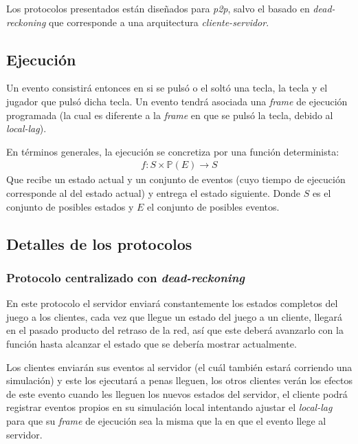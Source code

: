 Los protocolos presentados están diseñados para \emph{p2p}, salvo el basado en \emph{dead-reckoning} que corresponde a una arquitectura \emph{cliente-servidor}.

\subsection{Ejecución}

Un evento consistirá entonces en si se pulsó o el soltó una tecla, la tecla y el jugador que pulsó dicha tecla. Un evento tendrá asociada una \emph{frame} de ejecución programada (la cual es diferente a la \emph{frame} en que se pulsó la tecla, debido al \emph{local-lag}).

En términos generales, la ejecución se concretiza por una función determinista:
\begin{align*}
    f : S \times \mathbb{P}(E) \rightarrow S
\end{align*}
Que recibe un estado actual y un conjunto de eventos (cuyo tiempo de ejecución corresponde al del estado actual) y entrega el estado siguiente. Donde $S$ es el conjunto de posibles estados y $E$ el conjunto de posibles eventos.


\subsection{Detalles de los protocolos}


\subsubsection{Protocolo centralizado con \emph{dead-reckoning}}

En este protocolo el servidor enviará constantemente los estados completos del juego a los clientes, cada vez que llegue un estado del juego a un cliente, llegará en el pasado producto del retraso de la red, así que este deberá avanzarlo con la función hasta alcanzar el estado que se debería mostrar actualmente.

Los clientes enviarán sus eventos al servidor (el cuál también estará corriendo una simulación) y este los ejecutará a penas lleguen, los otros clientes verán los efectos de este evento cuando les lleguen los nuevos estados del servidor, %
el cliente podrá registrar eventos propios en su simulación local intentando ajustar el \emph{local-lag} para que su \emph{frame} de ejecución sea la misma que la en que el evento llege al servidor.

